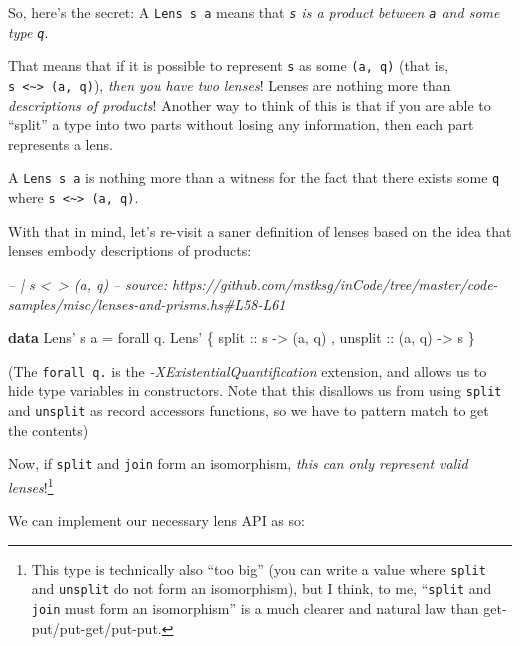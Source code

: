 \documentclass[]{article}
\newenvironment{Shaded}{}{}
\newcommand{\CommentTok}[1]{\textcolor[rgb]{0.38,0.63,0.69}{\textit{#1}}}
\newcommand{\DataTypeTok}[1]{\textcolor[rgb]{0.56,0.13,0.00}{#1}}
\newcommand{\FunctionTok}[1]{\textcolor[rgb]{0.02,0.16,0.49}{#1}}
\newcommand{\KeywordTok}[1]{\textcolor[rgb]{0.00,0.44,0.13}{\textbf{#1}}}
\newcommand{\NormalTok}[1]{#1}
\newcommand{\OtherTok}[1]{\textcolor[rgb]{0.00,0.44,0.13}{#1}}
\begin{document}
So, here's the secret: A \texttt{Lens\textquotesingle{}\ s\ a} means that
\emph{\texttt{s} is a product between \texttt{a} and some type \texttt{q}}.

That means that if it is possible to represent \texttt{s} as some
\texttt{(a,\ q)} (that is,
\texttt{s\ \textless{}\textasciitilde{}\textgreater{}\ (a,\ q)}), \emph{then you
have two lenses}! Lenses are nothing more than \emph{descriptions of products}!
Another way to think of this is that if you are able to ``split'' a type into
two parts without losing any information, then each part represents a lens.

A \texttt{Lens\textquotesingle{}\ s\ a} is nothing more than a witness for the
fact that there exists some \texttt{q} where
\texttt{s\ \textless{}\textasciitilde{}\textgreater{}\ (a,\ q)}.

With that in mind, let's re-visit a saner definition of lenses based on the idea
that lenses embody descriptions of products:

\begin{Shaded}
\begin{Highlighting}[]
\CommentTok{-- | s <~> (a, q)}
\CommentTok{-- source: https://github.com/mstksg/inCode/tree/master/code-samples/misc/lenses-and-prisms.hs#L58-L61}

\KeywordTok{data} \DataTypeTok{Lens'}\NormalTok{ s a }\FunctionTok{=}\NormalTok{ forall q}\FunctionTok{.} \DataTypeTok{Lens'}
\NormalTok{    \{}\OtherTok{ split   ::}\NormalTok{ s }\OtherTok{->}\NormalTok{ (a, q)}
\NormalTok{    ,}\OtherTok{ unsplit ::}\NormalTok{ (a, q) }\OtherTok{->}\NormalTok{ s}
\NormalTok{    \}}
\end{Highlighting}
\end{Shaded}

(The \texttt{forall\ q.} is the \emph{-XExistentialQuantification} extension,
and allows us to hide type variables in constructors. Note that this disallows
us from using \texttt{split} and \texttt{unsplit} as record accessors functions,
so we have to pattern match to get the contents)

Now, if \texttt{split} and \texttt{join} form an isomorphism, \emph{this can
only represent valid lenses}!\footnote{This type is technically also ``too big''
  (you can write a value where \texttt{split} and \texttt{unsplit} do not form
  an isomorphism), but I think, to me, ``\texttt{split} and \texttt{join} must
  form an isomorphism'' is a much clearer and natural law than
  get-put/put-get/put-put.}

We can implement our necessary lens API as so:
\end{document}
